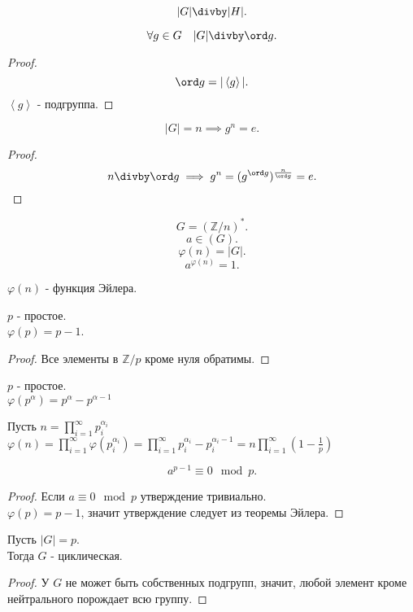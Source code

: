 \documentclass[11pt, oneside]{article}   	%
\begin{document}
    \begin{tlemma}
        \[ |G|\divby |H| .\]
    \end{tlemma}
    \begin{tlemma}
        \[ \forall{g\in G}\quad |G| \divby \ord g  .\]
        \begin{proof}
            \[ \ord g = |\left<g\right>| .\]
            $\left<g\right>$ - подгруппа.
        \end{proof}
    \end{tlemma}
    \begin{tlemma}
        \[ |G| = n \implies g^{n} = e .\]
        \begin{proof}
            \[ n\divby \ord g \implies g^{n} = (g^{\ord g})^{\frac{n}{\ord g}} = e .\] 
        \end{proof}
    \end{tlemma}
    \begin{tlemma}
        \[ G = \left( \mathbb{Z}/n \right)^{*}  .\] 
        \[ a\in \left(G\right)  .\]
        \[ \varphi(n) = |G| .\]
        \[ a^{\varphi(n)} = 1 .\]
    \end{tlemma}
    \begin{definition}
        $\varphi(n)$ - функция Эйлера.
    \end{definition}
    \begin{dlemma}
        $p$ - простое.\\
        $\varphi(p) = p-1$.
        \begin{proof}
            Все элементы в $\mathbb{Z}/p$ кроме нуля обратимы.
        \end{proof}
    \end{dlemma}
    \begin{dlemma}
        $p$ - простое.\\
        $\varphi(p^{\alpha}) = p^{\alpha} - p^{\alpha-1}$
    \end{dlemma}
    \begin{dlemma}
        Пусть $n = \prod\limits_{i=1}^{\infty} p_i^{\alpha_i}$\\
        $\varphi(n) = \prod\limits_{i=1}^{\infty} \varphi(p_i^{\alpha_i}) = \prod\limits_{i=1}^{\infty} p_i^{\alpha_i} - p_i^{\alpha_i - 1} = n\prod\limits_{i=1}^{\infty}(1-\frac{1}{p})   $
    \end{dlemma}
    \begin{theorem}
        \[ a^{p-1} \equiv 0\mod p .\] 
        \begin{proof}
            Если $a\equiv 0\mod p$ утверждение тривиально.\\
            $\varphi(p) = p-1$, значит утверждение следует из теоремы Эйлера. 
        \end{proof}
    \end{theorem}
    \begin{theorem}
        Пусть $|G| = p$.\\
        Тогда $G$ - циклическая.\\
        \begin{proof}
            У $G$ не может быть собственных подгрупп, значит, любой элемент кроме нейтрального порождает всю группу.
        \end{proof}
    \end{theorem}
\end{document}
